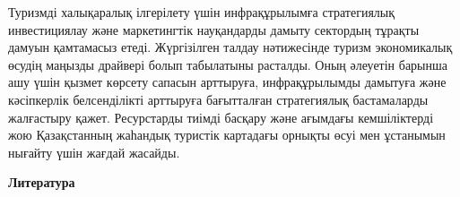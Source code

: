 \begin{multicols}{2}
Туризмді халықаралық ілгерілету үшін инфрақұрылымға стратегиялық
инвестициялау және маркетингтік науқандарды дамыту сектордың тұрақты
дамуын қамтамасыз етеді. Жүргізілген талдау нәтижесінде туризм
экономикалық өсудің маңызды драйвері болып табылатыны расталды. Оның
әлеуетін барынша ашу үшін қызмет көрсету сапасын арттыруға,
инфрақұрылымды дамытуға және кәсіпкерлік белсенділікті арттыруға
бағытталған стратегиялық бастамаларды жалғастыру қажет. Ресурстарды
тиімді басқару және ағымдағы кемшіліктерді жою Қазақстанның жаһандық
туристік картадағы орнықты өсуі мен ұстанымын нығайту үшін жағдай
жасайды.
\end{multicols}

\begin{center}
    {\bfseries Литература}
\end{center}

